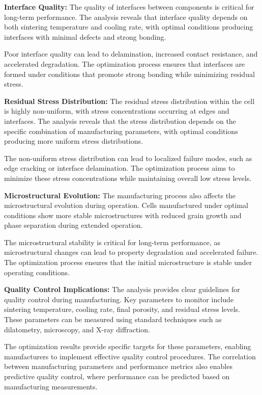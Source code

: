 \documentclass[conference]{IEEEtran}
\begin{document}
\textbf{Interface Quality:} The quality of interfaces between components is critical for long-term performance. The analysis reveals that interface quality depends on both sintering temperature and cooling rate, with optimal conditions producing interfaces with minimal defects and strong bonding.

Poor interface quality can lead to delamination, increased contact resistance, and accelerated degradation. The optimization process ensures that interfaces are formed under conditions that promote strong bonding while minimizing residual stress.

\textbf{Residual Stress Distribution:} The residual stress distribution within the cell is highly non-uniform, with stress concentrations occurring at edges and interfaces. The analysis reveals that the stress distribution depends on the specific combination of manufacturing parameters, with optimal conditions producing more uniform stress distributions.

The non-uniform stress distribution can lead to localized failure modes, such as edge cracking or interface delamination. The optimization process aims to minimize these stress concentrations while maintaining overall low stress levels.

\textbf{Microstructural Evolution:} The manufacturing process also affects the microstructural evolution during operation. Cells manufactured under optimal conditions show more stable microstructures with reduced grain growth and phase separation during extended operation.

The microstructural stability is critical for long-term performance, as microstructural changes can lead to property degradation and accelerated failure. The optimization process ensures that the initial microstructure is stable under operating conditions.

\textbf{Quality Control Implications:} The analysis provides clear guidelines for quality control during manufacturing. Key parameters to monitor include sintering temperature, cooling rate, final porosity, and residual stress levels. These parameters can be measured using standard techniques such as dilatometry, microscopy, and X-ray diffraction.

The optimization results provide specific targets for these parameters, enabling manufacturers to implement effective quality control procedures. The correlation between manufacturing parameters and performance metrics also enables predictive quality control, where performance can be predicted based on manufacturing measurements.
\end{document}
